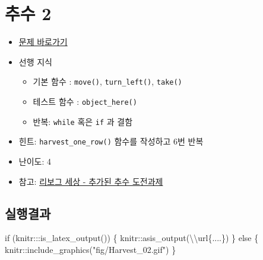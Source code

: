 \documentclass[
  b5paperpaper,
  DIV=11,
  numbers=noendperiod]{scrreprt}
\newenvironment{Shaded}{\begin{snugshade}}{\end{snugshade}}
\newcommand{\ControlFlowTok}[1]{\textcolor[rgb]{0.00,0.23,0.31}{#1}}
\newcommand{\FunctionTok}[1]{\textcolor[rgb]{0.28,0.35,0.67}{#1}}
\newcommand{\NormalTok}[1]{\textcolor[rgb]{0.00,0.23,0.31}{#1}}
\newcommand{\SpecialCharTok}[1]{\textcolor[rgb]{0.37,0.37,0.37}{#1}}
\newcommand{\StringTok}[1]{\textcolor[rgb]{0.13,0.47,0.30}{#1}}
\providecommand{\tightlist}{%
  \setlength{\itemsep}{0pt}\setlength{\parskip}{0pt}}\usepackage{longtable,booktabs,array}
\begin{document}
\hypertarget{harvest-02}{%
\section{추수 2}\label{harvest-02}}

\begin{itemize}
\tightlist
\item
  \href{https://reeborg.ca/reeborg.html?lang=ko-en\&mode=python\&menu=worlds\%2Fmenus\%2Freeborg_intro_en.json\&name=Harvest\%202\&url=worlds\%2Ftutorial_en\%2Fharvest2.json}{문제
  바로가기}
\item
  선행 지식

  \begin{itemize}
  \tightlist
  \item
    기본 함수 : \texttt{move()}, \texttt{turn\_left()}, \texttt{take()}
  \item
    테스트 함수 : \texttt{object\_here()}
  \item
    반복: \texttt{while} 혹은 \texttt{if} 과 결함
  \end{itemize}
\item
  힌트: \texttt{harvest\_one\_row()} 함수를 작성하고 6번 반복
\item
  난이도: 4
\item
  참고: \href{https://reeborg.ca/docs/ko/variables/harvest3.html}{리보그
  세상 - 추가된 추수 도전과제}
\end{itemize}

\hypertarget{uxc2e4uxd589uxacb0uxacfc-26}{%
\subsection{실행결과}\label{uxc2e4uxd589uxacb0uxacfc-26}}

\begin{Shaded}
\begin{Highlighting}[]
\ControlFlowTok{if}\NormalTok{ (knitr}\SpecialCharTok{:::}\FunctionTok{is\_latex\_output}\NormalTok{()) \{}
\NormalTok{  knitr}\SpecialCharTok{::}\FunctionTok{asis\_output}\NormalTok{(}\StringTok{\textquotesingle{}}\SpecialCharTok{\textbackslash{}\textbackslash{}}\StringTok{url\{....\}\textquotesingle{}}\NormalTok{)}
\NormalTok{\} }\ControlFlowTok{else}\NormalTok{ \{}
\NormalTok{  knitr}\SpecialCharTok{::}\FunctionTok{include\_graphics}\NormalTok{(}\StringTok{"fig/Harvest\_02.gif"}\NormalTok{)}
\NormalTok{\}}
\end{Highlighting}
\end{Shaded}
\end{document}
